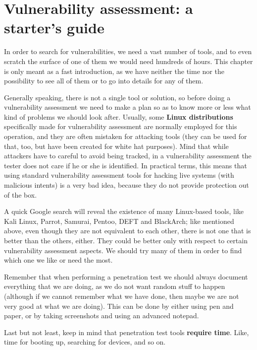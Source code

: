 \chapter[Vulnerability assessment]{Vulnerability assessment: a starter's guide}
\label{ch:vuln_assessment}

In order to search for vulnerabilities, we need a vast number of tools, and to even scratch the surface of one of them we would need hundreds of hours. This chapter is only meant as a fast introduction, as we have neither the time nor the possibility to see all of them or to go into details for any of them.
 
Generally speaking, there is not a single tool or solution, so before doing a vulnerability assessment we need to make a plan so as to know more or less what kind of problems we should look after. Usually, some \textbf{Linux distributions} specifically made for vulnerability assessment are normally employed for this operation, and they are often mistaken for attacking tools (they can be used for that, too, but have been created for white hat purposes). Mind that while attackers have to careful to avoid being tracked, in a vulnerability assessment the tester does not care if he or she is identified. In practical terms, this means that using standard vulnerability assessment tools for hacking live systems (with malicious intents) is a very bad idea, because they do not provide protection out of the box.

A quick Google search will reveal the existence of many Linux-based tools, like Kali Linux, Parrot, Samurai, Pentoo, DEFT and BlackArch; like mentioned above, even though they are not equivalent to each other, there is not one that is better than the others, either. They could be better only with respect to certain vulnerability assessment aspects. We should try many of them in order to find which one we like or need the most.

Remember that when performing a penetration test we should always document everything that we are doing, as we do not want random stuff to happen (although if we cannot remember what we have done, then maybe we are not very good at what we are doing). This can be done by either using pen and paper, or by taking screenshots and using an advanced notepad.

Last but not least, keep in mind that penetration test tools \textbf{require time}. Like, time for booting up, searching for devices, and so on.
 

